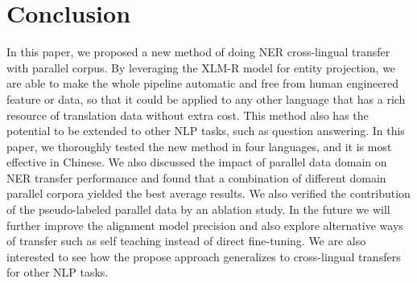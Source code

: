 \documentclass[11pt]{article}
\begin{document}
\section{Conclusion}
In this paper, we proposed a new method of doing NER cross-lingual transfer with parallel corpus. By leveraging the XLM-R model for entity projection, we are able to make the whole pipeline automatic and free from human engineered feature or data, so that it could be applied to any other language that has a rich resource of translation data without extra cost. This method also has the potential to be extended to other NLP tasks, such as question answering. In this paper, we thoroughly tested the new method in four languages, and it is most effective in Chinese. We also discussed the impact of parallel data domain on NER transfer performance and found that a combination of different domain parallel corpora yielded the best average results. We also verified the contribution of the pseudo-labeled parallel data by an ablation study. In the future we will further improve the alignment model precision and also explore alternative ways of transfer such as self teaching instead of direct fine-tuning. We are also interested to see how the propose approach generalizes to cross-lingual transfers for other NLP tasks.



\end{document}
